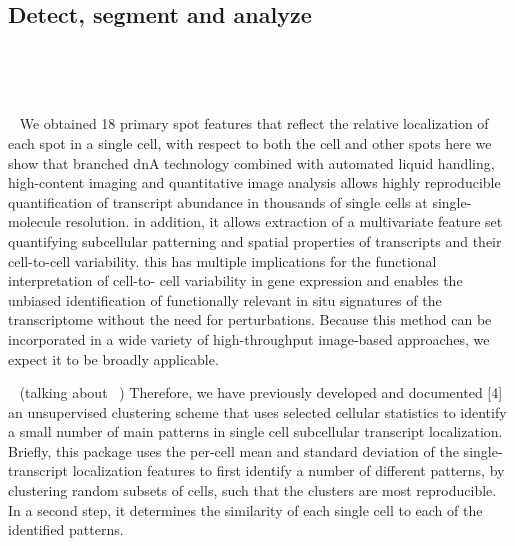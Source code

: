 \subsection{Detect, segment and analyze}

~\cite{shariff_automated_2010}
~\cite{laux_interactive_2020}
~\cite{das_intracellular_2021}

~\cite{mcquin_cellprofiler_2018}
~\cite{mueller_fish-quant_2013}
~\cite{de_chaumont_icy_2012}
~\cite{ershov_bringing_2021} %
~\cite{ljosa_introduction_2009}
~\cite{stoeger_computer_2015}
~\cite{perkel_starfish_2019}
~\cite{noauthor_mammalian_2020}
~\cite{eng_transcriptome-scale_2019}
~\cite{kamenova_co-translational_2019}
~\cite{liao_rna_2019}
~\cite{xia_spatial_2019}
~\cite{tsanov_smifish_2016}
~\cite{samacoits_computational_2018}
~\cite{battich_image-based_2013}
~\cite{savulescu_interrogating_2021}

~\cite{battich_image-based_2013}
We obtained 18 primary spot features that reflect the
relative localization of each spot in a single cell, with respect to both the cell and other spots
here we show that branched dnA technology combined with automated liquid handling, high-content imaging and quantitative image analysis allows highly reproducible quantification of transcript abundance in thousands of single cells at single-molecule resolution.
in addition, it allows extraction of a multivariate feature set quantifying subcellular patterning and spatial properties of transcripts and their cell-to-cell variability. this has multiple implications for the functional interpretation of cell-to-
cell variability in gene expression and enables the unbiased identification of functionally relevant in situ signatures
of the transcriptome without the need for perturbations. Because this method can be incorporated in a wide variety of high-throughput image-based approaches, we expect it to be broadly applicable.

~\cite{stoeger_computer_2015}
(talking about ~\cite{battich_image-based_2013})
Therefore, we have previously developed and documented [4] an unsupervised
clustering scheme that uses selected cellular statistics to identify a small
number of main patterns in single cell subcellular transcript localization.
Briefly, this package uses the per-cell mean and standard deviation of the
single-transcript localization features to first identify a number of
different patterns, by clustering random subsets of cells, such that
the clusters are most reproducible. In a second step, it determines the
similarity of each single cell to each of the identified patterns.

